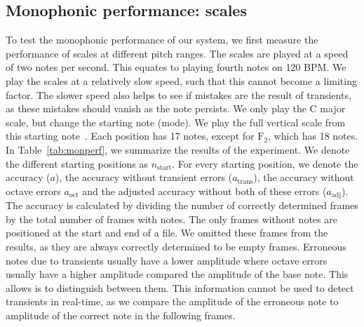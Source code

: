 \documentclass[10pt,twocolumn]{article}
\begin{document}
\subsection{Monophonic performance: scales}
To test the monophonic performance of our system, we first measure the performance of scales at different pitch ranges. The scales are played at a speed of two notes per second. This equates to playing fourth notes on 120 BPM. We play the scales at a relatively slow speed, such that this cannot become a limiting factor. The slower speed also helps to see if mistakes are the result of transients, as these mistakes should vanish as the note persists. We only play the C major scale, but change the starting note (mode). We play the full vertical scale from this starting note~\cite{scale}. Each position has 17 notes, except for $\text{F}_2$, which has 18 notes. In Table~\ref{tab:monperf}, we summarize the results of the experiment. We denote the different starting positions as $n_\text{start}$. For every starting position, we denote the accuracy ($a$), the accuracy without transient errors ($a_\text{trans}$), the accuracy without octave errors $a_\text{oct}$ and the adjusted accuracy without both of these errors ($a_\text{adj}$). The accuracy is calculated by dividing the number of correctly determined frames by the total number of frames with notes. The only frames without notes are positioned at the start and end of a file. We omitted these frames from the results, as they are always correctly determined to be empty frames. Erroneous notes due to transients usually have a lower amplitude where octave errors usually have a higher amplitude compared the amplitude of the base note. This allows is to distinguish between them. This information cannot be used to detect transients in real-time, as we compare the amplitude of the erroneous note to amplitude of the correct note in the following frames.
\end{document}
